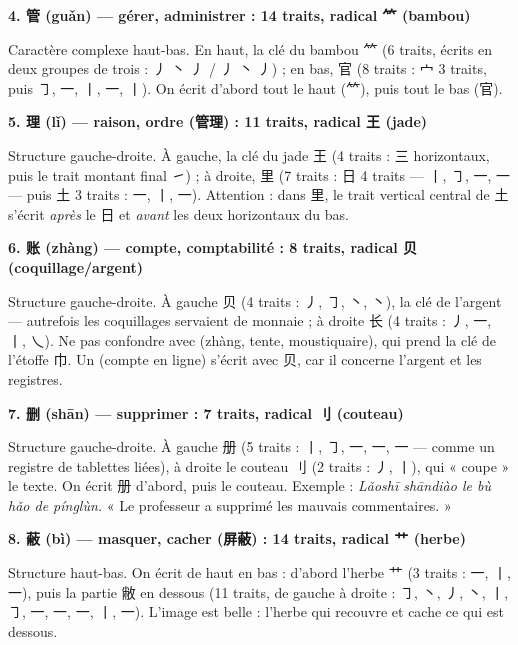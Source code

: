 \documentclass[11pt]{article}
\newcommand{\cle}[1]{{\popxbold\color{popdark}#1}}
\newcommand{\zh}[1]{\ifmmode\text{#1}\else{#1}\fi}
\begin{document}
\textbf{4. 管 (guǎn) — gérer, administrer : 14 traits, radical ⺮ (bambou)}\par
Caractère complexe haut-bas. En haut, la clé du bambou ⺮ (6 traits, écrits en deux groupes de trois : 丿 丶 丿 / 丿 丶 丿) ; en bas, 官 (8 traits : 宀 3 traits, puis ㇆, 一, 丨, 一, 丨). On écrit d'abord tout le haut (⺮), puis tout le bas (官).

\textbf{5. 理 (lǐ) — raison, ordre (管理) : 11 traits, radical 王 (jade)}\par
Structure gauche-droite. À gauche, la clé du jade 王 (4 traits : 三 horizontaux, puis le trait montant final ㇀) ; à droite, 里 (7 traits : 日 4 traits — 丨, ㇆, 一, 一 — puis 土 3 traits : 一, 丨, 一). Attention : dans 里, le trait vertical central de 土 s'écrit \emph{après} le 日 et \emph{avant} les deux horizontaux du bas.

\textbf{6. 账 (zhàng) — compte, comptabilité : 8 traits, radical 贝 (coquillage/argent)}\par
Structure gauche-droite. À gauche 贝 (4 traits : 丿, ㇆, 丶, 丶), la clé de l'argent — autrefois les coquillages servaient de monnaie ; à droite 长 (4 traits : 丿, 一, 丨, 乀). Ne pas confondre avec \zh{帐} (zhàng, tente, moustiquaire), qui prend la clé de l'étoffe 巾. Un \zh{账号} (compte en ligne) s'écrit avec 贝, car il concerne l'argent et les registres.

\textbf{7. 删 (shān) — supprimer : 7 traits, radical 刂 (couteau)}\par
Structure gauche-droite. À gauche 册 (5 traits : 丨, ㇆, 一, 一, 一 — comme un registre de tablettes liées), à droite le couteau 刂 (2 traits : 丿, 丨), qui « coupe » le texte. On écrit 册 d'abord, puis le couteau.
Exemple : \zh{老师删掉了不好的评论。} \emph{Lǎoshī shāndiào le bù hǎo de pínglùn.} « Le professeur a supprimé les mauvais commentaires. »

\textbf{8. 蔽 (bì) — masquer, cacher (屏蔽) : 14 traits, radical 艹 (herbe)}\par
Structure haut-bas. On écrit de haut en bas : d'abord l'herbe 艹 (3 traits : 一, 丨, 一), puis la partie 敝 en dessous (11 traits, de gauche à droite : ㇆, 丶, 丿, 丶, 丨, ㇆, 一, 一, 一, 丨, 一). L'image est belle : l'herbe qui \cle{recouvre} et cache ce qui est dessous.
\end{document}
